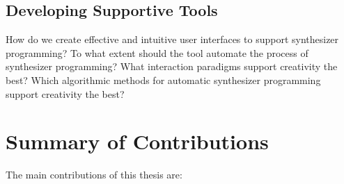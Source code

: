 \subsection{Developing Supportive Tools}
How do we create effective and intuitive user interfaces to support synthesizer programming? To what extent should the tool automate the process of synthesizer programming? What interaction paradigms support creativity the best? Which algorithmic methods for automatic synthesizer programming support creativity the best?


%
%
%
%
%
%
%

\section{Summary of Contributions}
The main contributions of this thesis are:

